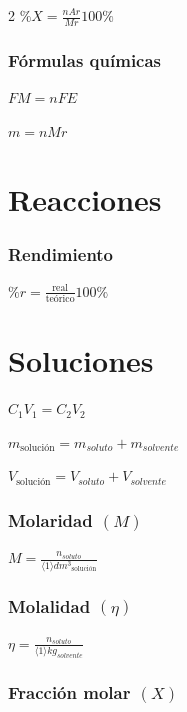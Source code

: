 \begin {multicols}{2}
\(\%X=\frac{nAr}{Mr}100\%\)

\hypertarget{fuxf3rmulas-quuxedmicas}{%
\subsubsection{Fórmulas químicas}\label{fuxf3rmulas-quuxedmicas}}

\(FM=nFE\)

\(m=nMr\)

\hypertarget{reacciones}{%
\section{Reacciones}\label{reacciones}}

\hypertarget{rendimiento}{%
\subsubsection{Rendimiento}\label{rendimiento}}

\(\%r=\frac{\text{real}}{\text{teórico}}100\%\)

\hypertarget{soluciones}{%
\section{Soluciones}\label{soluciones}}

\(C_1V_1=C_2V_2\)

\(m_{\text{solución}}=m_{soluto}+m_{solvente}\)

\(V_{\text{solución}}=V_{soluto}+V_{solvente}\)

\hypertarget{molaridad-m}{%
\subsubsection{\texorpdfstring{Molaridad
\((M)\)}{Molaridad (M)}}\label{molaridad-m}}

\(M=\frac{n_{soluto}}{{\langle}1{\rangle}{dm^3}_{\text{solución}}}\)

\hypertarget{molalidad-eta}{%
\subsubsection{\texorpdfstring{Molalidad
\((\eta)\)}{Molalidad (\textbackslash eta)}}\label{molalidad-eta}}

\(\eta=\frac{n_{soluto}}{{\langle}1{\rangle}kg_{solvente}}\)

\hypertarget{fracciuxf3n-molar-x}{%
\subsubsection{\texorpdfstring{Fracción molar
\((X)\)}{Fracción molar (X)}}\label{fracciuxf3n-molar-x}}


\end{multicols}
